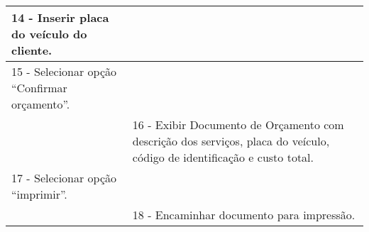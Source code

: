 \begin{tabular}{|p{7cm}|p{7cm}|}
	
	14 - Inserir placa do veículo do cliente. 
	&  \\ 
	\hline 
	
	
	15 - Selecionar opção “Confirmar orçamento”.
	&  \\ 
	\hline 
	& 
	
	16 - Exibir Documento de Orçamento com descrição dos serviços, placa do veículo, código de identificação e  custo total.
	\\ 
	\hline 
	
	
	17 - Selecionar opção “imprimir”.
	&  \\ 
	\hline 
	& 
	
	18 - Encaminhar documento para impressão.
	\\ 
	\hline 
\end{tabular} 
\vspace{12px}	


